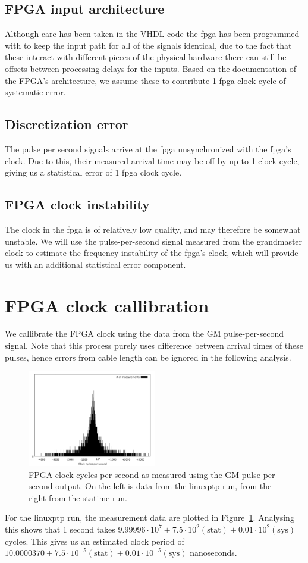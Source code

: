 \documentclass{article}
\begin{document}
\subsection{FPGA input architecture}
Although care has been taken in the VHDL code the fpga has been programmed with to keep the input path for all of the signals identical, due to the fact that these interact with different pieces of the physical hardware there can still be offsets between processing delays for the inputs. Based on the documentation of the FPGA's architecture, we assume these to contribute 1 fpga clock cycle of systematic error.
\subsection{Discretization error}
The pulse per second signals arrive at the fpga unsynchronized with the fpga's clock. Due to this, their measured arrival time may be off by up to 1 clock cycle, giving us a statistical error of 1 fpga clock cycle.
\subsection{FPGA clock instability}
The clock in the fpga is of relatively low quality, and may therefore be somewhat unstable. We will use the pulse-per-second signal measured from the grandmaster clock to estimate the frequency instability of the fpga's clock, which will provide us with an additional statistical error component.

\section{FPGA clock callibration}

We callibrate the FPGA clock using the data from the GM pulse-per-second signal. Note that this process purely uses difference between arrival times of these pulses, hence errors from cable length can be ignored in the following analysis.

\begin{figure}[h]
\includegraphics[width=0.5\textwidth]{gm_clocks_per_sec_ref.pdf}
\caption{FPGA clock cycles per second as measured using the GM pulse-per-second output. On the left is data from the linuxptp run, from the right from the statime run.}
\label{fig:gm_cycles_per_second}
\end{figure}

For the linuxptp run, the measurement data are plotted in Figure~\ref{fig:gm_cycles_per_second}. Analysing this shows that 1 second takes $9.99996\cdot 10^7 \pm 7.5\cdot 10^2 (\text{stat}) \pm 0.01\cdot 10^2 (\text{sys})$ cycles. This gives us an estimated clock period of $10.0000370 \pm 7.5\cdot 10^{-5} (\text{stat}) \pm 0.01\cdot 10^{-5} (\text{sys})$ nanoseconds.
\end{document}
